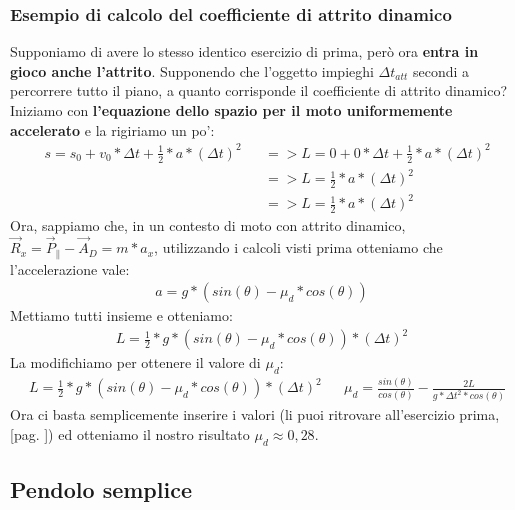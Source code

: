         \subsubsection{Esempio di calcolo del coefficiente di attrito dinamico}
            Supponiamo di avere lo stesso identico esercizio di prima, però ora \textbf{entra in gioco anche l'attrito}. Supponendo che l'oggetto impieghi $\Delta t_{att}$ secondi a percorrere tutto il piano, a quanto corrisponde il coefficiente di attrito dinamico?\\
            Iniziamo con \textbf{l'equazione dello spazio per il moto uniformemente accelerato} e la rigiriamo un po':
            \begin{align*}
                &s = s_0 + v_0*\Delta t + \frac{1}{2}*a*(\Delta t)^2 &&=> L = 0 + 0*\Delta t + \frac{1}{2}*a*(\Delta t)^2\\
                & && => L = \frac{1}{2}*a*(\Delta t)^2\\
                & && => L = \frac{1}{2}*a*(\Delta t)^2
            \end{align*}
            Ora, sappiamo che, in un contesto di moto con attrito dinamico, $\vec{R}_x = \vec{P}_\parallel -\vec{A}_D = m * a_x$, utilizzando i calcoli visti prima otteniamo che l'accelerazione vale:
            \begin{align*}
                a = g*(sin(\theta) - \mu_d*cos(\theta))
            \end{align*}
            Mettiamo tutti insieme e otteniamo:
            \begin{align*}
                L = \frac{1}{2}*g*(sin(\theta) - \mu_d*cos(\theta))*(\Delta t)^2
            \end{align*}
            La modifichiamo per ottenere il valore di $\mu_d$:
            \begin{align*}
                &L = \frac{1}{2}*g*(sin(\theta) - \mu_d*cos(\theta))*(\Delta t)^2 && \mu_d =\frac{sin(\theta)}{cos(\theta)}-\frac{2L}{g*\Delta t^2*cos(\theta)}
            \end{align*}
            Ora ci basta semplicemente inserire i valori (li puoi ritrovare all'esercizio prima, [pag. \pageref{EsercizioConAttrito}]) ed otteniamo il nostro risultato $\mu_d \approx 0,28$.

    \subsection{Pendolo semplice}
